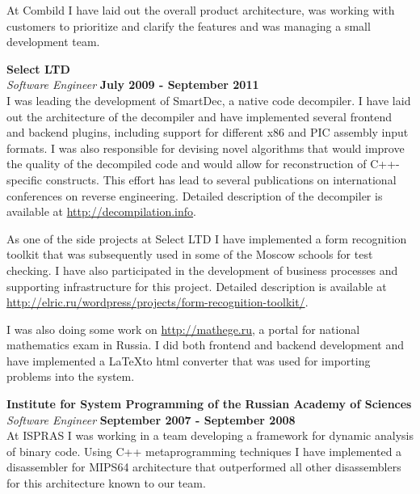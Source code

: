 \documentclass[margin,line]{CV}
\begin{document}
\begin{resume}
    At Combild I have laid out the overall product architecture, was working with customers to prioritize and clarify the features and was managing a small development team.
    

    
    \textbf{Select LTD} \vspace{2mm}\\\vspace{1mm}%
    \textsl{Software Engineer} \hfill \textbf{July 2009 - September 2011}\\
    I was leading the development of SmartDec, a native code decompiler. I have laid out the architecture of the decompiler and have implemented several frontend and backend plugins, including support for different x86 and PIC assembly input formats. I was also responsible for devising novel algorithms that would improve the quality of the decompiled code and would allow for reconstruction of C++-specific constructs. This effort has lead to several publications on international conferences on reverse engineering. Detailed description of the decompiler is available at \url{http://decompilation.info}.
    
    As one of the side projects at Select LTD I have implemented a form recognition toolkit that was subsequently used in some of the Moscow schools for test checking. I have also participated in the development of business processes and supporting infrastructure for this project. Detailed description is available at \url{http://elric.ru/wordpress/projects/form-recognition-toolkit/}. 

    I was also doing some work on \url{http://mathege.ru}, a portal for national mathematics exam in Russia. I did both frontend and backend development and have implemented a \LaTeX to html converter that was used for importing problems into the system.

    
    \textbf{Institute for System Programming of the Russian Academy of Sciences} \vspace{2mm}\\\vspace{1mm}%
    \textsl{Software Engineer} \hfill \textbf{September 2007 - September 2008}\\
    At ISPRAS I was working in a team developing a framework for dynamic analysis of binary code. Using C++ metaprogramming techniques I have implemented a disassembler for MIPS64 architecture that outperformed all other disassemblers for this architecture known to our team.


\end{resume}
\end{document}
